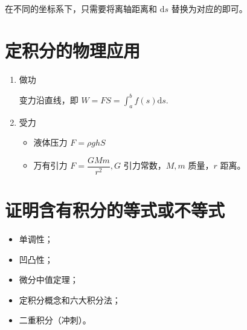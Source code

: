 在不同的坐标系下，只需要将离轴距离和 $ \mathrm{d}s $ 替换为对应的即可。

\section{定积分的物理应用}

\begin{enumerate}
    \item 做功
    
    变力沿直线，即 $ W = FS= \int_a^b f(s)\mathrm{d}s. $ 
    \item 受力
    \begin{itemize}
        \item 液体压力 $ F = \rho ghS $ 
        \item 万有引力 $ F = \dfrac{GMm}{r^2}, G $ 引力常数，$ M,m $ 质量，$ r $ 距离。
    \end{itemize}
\end{enumerate}

\section{证明含有积分的等式或不等式}

\begin{itemize}
    \item 单调性；
    \item 凹凸性；
    \item 微分中值定理；
    \item 定积分概念和六大积分法；
    \item 二重积分（冲刺）。
\end{itemize}